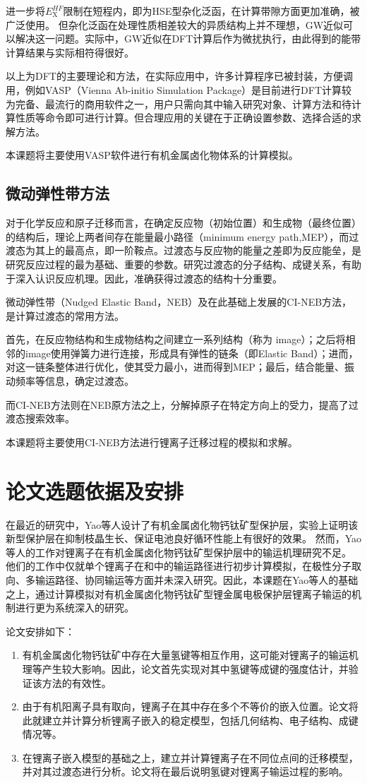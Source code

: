 进一步将$E^{HF}_{\mathrm{X}}$限制在短程内，即为HSE型杂化泛函，在计算带隙方面更加准确，被广泛使用。
但杂化泛函在处理性质相差较大的异质结构上并不理想，GW近似可以解决这一问题。实际中，GW近似在DFT计算后作为微扰执行，由此得到的能带计算结果与实际相符得很好。

以上为DFT的主要理论和方法，在实际应用中，许多计算程序已被封装，方便调用，例如VASP（Vienna Ab-initio Simulation Package）是目前进行DFT计算较为完备、最流行的商用软件之一，用户只需向其中输入研究对象、计算方法和待计算性质等命令即可进行计算。但合理应用的关键在于正确设置参数、选择合适的求解方法。

本课题将主要使用VASP软件进行有机金属卤化物体系的计算模拟。

\subsection{微动弹性带方法}

对于化学反应和原子迁移而言，在确定反应物（初始位置）和生成物（最终位置）的结构后，理论上两者间存在能量最小路径（minimum energy path,MEP），而过渡态为其上的最高点，即一阶鞍点。过渡态与反应物的能量之差即为反应能垒，是研究反应过程的最为基础、重要的参数。研究过渡态的分子结构、成键关系，有助于深入认识反应机理。因此，准确获得过渡态的结构十分重要。

微动弹性带（Nudged Elastic Band，NEB）及在此基础上发展的CI-NEB方法，是计算过渡态的常用方法。

首先，在反应物结构和生成物结构之间建立一系列结构（称为 image）；之后将相邻的image使用弹簧力进行连接，形成具有弹性的链条（即Elastic Band）；进而，对这一链条整体进行优化，使其受力最小，进而得到MEP；最后，结合能量、振动频率等信息，确定过渡态。

而CI-NEB方法则在NEB原方法之上，分解掉原子在特定方向上的受力，提高了过渡态搜索效率。

本课题将主要使用CI-NEB方法进行锂离子迁移过程的模拟和求解。

\section{论文选题依据及安排}

在最近的研究中，Yao等人设计了有机金属卤化物钙钛矿型保护层，实验上证明该新型保护层在抑制枝晶生长、保证电池良好循环性能上有很好的效果。
然而，Yao等人的工作对锂离子在有机金属卤化物钙钛矿型保护层中的输运机理研究不足。
他们的工作中仅就单个锂离子在和中的输运路径进行初步计算模拟，在极性分子取向、多输运路径、协同输运等方面并未深入研究。因此，本课题在Yao等人的基础之上，通过计算模拟对有机金属卤化物钙钛矿型锂金属电极保护层锂离子输运的机制进行更为系统深入的研究。

论文安排如下：

\begin{enumerate}
    \item 有机金属卤化物钙钛矿中存在大量氢键等相互作用，这可能对锂离子的输运机理等产生较大影响。因此，论文首先实现对其中氢键等成键的强度估计，并验证该方法的有效性。
    \item 由于有机阳离子具有取向，锂离子在其中存在多个不等价的嵌入位置。论文将此就建立并计算分析锂离子嵌入的稳定模型，包括几何结构、电子结构、成键情况等。
    \item 在锂离子嵌入模型的基础之上，建立并计算锂离子在不同位点间的迁移模型，并对其过渡态进行分析。论文将在最后说明氢键对锂离子输运过程的影响。
\end{enumerate}

